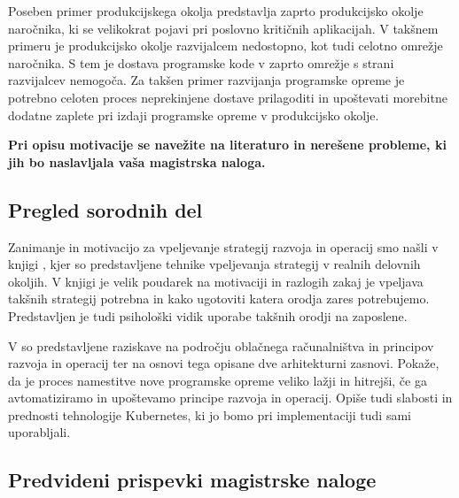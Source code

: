 \documentclass[a4paper, 12pt]{article}
\newcommand\cmnt[1]{\textcolor{munsell}{#1}}
\begin{document}
Poseben primer produkcijskega okolja predstavlja zaprto produkcijsko okolje naročnika, ki se velikokrat pojavi pri poslovno kritičnih aplikacijah. V takšnem primeru je produkcijsko okolje razvijalcem nedostopno, kot tudi celotno omrežje naročnika. S tem je dostava programske kode v zaprto omrežje s strani razvijalcev nemogoča. Za takšen primer razvijanja programske opreme je potrebno celoten proces neprekinjene dostave prilagoditi in upoštevati morebitne dodatne zaplete pri izdaji programske opreme v produkcijsko okolje.

\textbf{Pri opisu motivacije se navežite na literaturo in nerešene probleme, ki jih bo naslavljala vaša magistrska naloga.}


\subsection{Pregled sorodnih del}

Zanimanje in motivacijo za vpeljevanje strategij razvoja in operacij smo našli v knjigi \cite{smith_2020}, kjer so predstavljene tehnike vpeljevanja strategij v realnih delovnih okoljih. V knjigi je velik poudarek na motivaciji in razlogih zakaj je vpeljava takšnih strategij potrebna in kako ugotoviti katera orodja zares potrebujemo. Predstavljen je tudi psihološki vidik uporabe takšnih orodji na zaposlene.

V \cite{KOCEVAR_2019} so predstavljene raziskave na področju oblačnega računalništva in principov razvoja in operacij ter na osnovi tega opisane dve arhitekturni zasnovi. Pokaže, da je proces namestitve nove programske opreme veliko lažji in hitrejši, če ga avtomatiziramo in upoštevamo principe razvoja in operacij. Opiše tudi slabosti in prednosti tehnologije Kubernetes, ki jo bomo pri implementaciji tudi sami uporabljali.



\subsection{Predvideni prispevki magistrske naloge}
\end{document}
